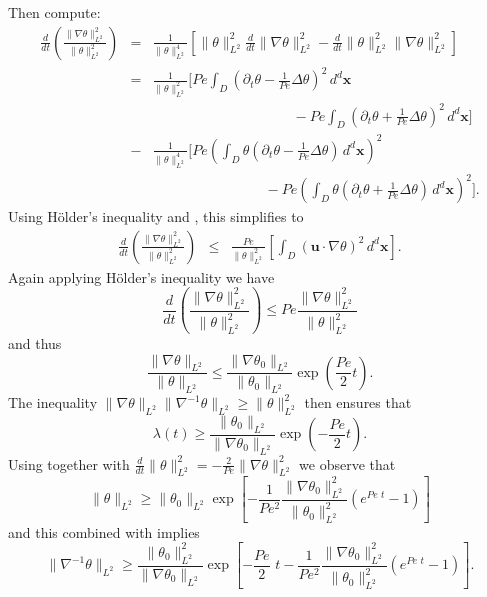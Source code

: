 \documentclass[12pt]{iopart}
\newcommand{\ddt}[1]{\frac{d #1}{dt}}
\newcommand{\hmone}[1]{\|\nabla^{-1} #1\|_{L^{2}}}
\newcommand{\ltwo}[1]{\|#1\|_{L^{2}}}
\newcommand{\hone}[1]{\| \nabla #1\|_{L^{2}}}
\newcommand{\sint}[1]{\int_{D} #1 \, d^{d}\mathbf{x}}
\renewcommand{\vec}[1]{\mathbf{#1}}
\newcommand{\ppt}[1]{\partial_{t} #1}
\newcommand{\lap}{\Delta }
\newcommand{\pbrac}[1]{\left( #1 \right)}
\newcommand{\sbrac}[1]{\left[ #1 \right]}
\begin{document}
Then compute:
%
\begin{eqnarray*}
	\ddt{} \pbrac{ \frac{\hone{\theta}^2}{\ltwo{\theta}^2} } 
			&=& \frac{1}{\ltwo{\theta}^4}
			\sbrac{
				\ltwo{\theta}^2\ddt{}\hone{\theta}^2
				-\ddt{}\ltwo{\theta}^2\hone{\theta}^2			
			}\\
			&=& \frac{1}{\ltwo{\theta}^2}
			 \Bigg[ Pe \sint{\left(\ppt{\theta} -\frac{1}{Pe}\lap \theta\right)^2}  \\
 				& & \qquad\qquad\qquad \qquad \qquad 
				-Pe\sint{\left(\ppt{\theta}+\frac{1}{Pe}\lap \theta\right)^2} 
			\Bigg]\\
		        &-&\frac{1}{\ltwo{\theta}^4}
			\Bigg[ 
				Pe \pbrac{\sint{\theta\left(\ppt{\theta}-\frac{1}{Pe}\lap \theta\right)} }^2\\
 				& & \qquad\qquad\qquad \qquad
				-Pe\pbrac{
					 \sint{\theta\left(\ppt{\theta}
	 									+\frac{1}{Pe}\lap \theta\right)} 
 				}^2					
			\Bigg].
\end{eqnarray*}
%
Using H\"older's inequality and , this simplifies to
%
\begin{eqnarray*}
	\ddt{} \pbrac{ \frac{\hone{\theta}^2}{\ltwo{\theta}^2} } 
			&\leq & \frac{Pe}{\ltwo{\theta}^2}
			\sbrac{
					 \sint{(\vec{u}\cdot \nabla \theta)^2} 
			}.
\end{eqnarray*}
Again applying H\"older's inequality we have
\begin{equation}
\label{eq:k2growth_energy}
	\ddt{} 
		\pbrac{ 
			\frac{\hone{\theta}^2}{\ltwo{\theta}^2} 
		} 
		\leq  
		Pe
		\frac{\hone{\theta}^2}{\ltwo{\theta}^2} 
\end{equation}
%
and thus 
%
\begin{equation*}
		\frac{\hone{\theta}}{\ltwo{\theta}} 
		\leq  
		\frac{\hone{\theta_0}}{\ltwo{\theta_0}}
		\exp{\pbrac{\frac{Pe}{2} t}}.
\end{equation*}
%
The inequality $\hone{\theta}\hmone{\theta}\geq \ltwo{\theta}^2$ then ensures that
%
\begin{equation}
\label{eq:lambda_bound}
\lambda(t) \geq \frac{\ltwo{\theta_0}}{\hone{\theta_0}}\exp{\pbrac{-\frac{Pe}{2}t}}.
\end{equation}
%
Using  together with  $\ddt{}\ltwo{\theta}^2 = -\frac{2}{Pe} \hone{\theta}^2$ we observe that
%
\begin{equation*}
\ltwo{\theta}\geq \ltwo{\theta_{0}}\exp\left[-\frac{1}{Pe^2}\frac{\hone{\theta_0}^2}{\ltwo{\theta_0}^2}\left(e^{Pe \, \, t}-1\right)\right]
\end{equation*}
%
and this combined with   implies
%
\begin{equation}
\hmone{\theta}\geq \frac{\ltwo{\theta_{0}}^2}{\hone{\theta_0}}\exp\left[-\frac{Pe}{2} \,\, t-\frac{1}{Pe^2}\frac{\hone{\theta_0}^2}{\ltwo{\theta_0}^2}\left(e^{Pe \,\, t}-1\right)\right].
\end{equation}
\end{document}
